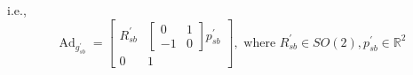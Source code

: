 i.e.,
\begin{equation*}
    \operatorname{Ad}_{g_{s b}^{\prime}}=\left[\begin{array}{cc}
            R_{s b}^{\prime} & {\left[\begin{array}{cc}
                                                      0  & 1 \\
                                                      -1 & 0
                                                  \end{array}\right] p_{s b}^{\prime}} \\
            0                & 1
        \end{array}\right], \text { where } R_{s b}^{\prime} \in S O(2), p_{s b}^{\prime} \in \mathbb{R}^{2}
\end{equation*}
